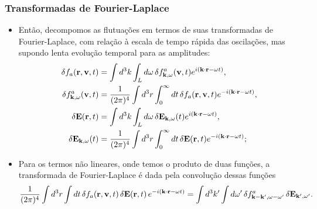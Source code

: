 \documentclass[10pt,aspectratio=1610,lualatex]{beamer}
\begin{document}
\begin{frame}
  \frametitle{Transformadas de Fourier-Laplace}
  \begin{itemize}
    \item Então, decompomos as flutuações em termos de suas
    transformadas de Fourier-Laplace, com relação à escala de
    tempo rápida das oscilações, mas supondo lenta evolução
    temporal para as amplitudes:
    \begin{equation*}
      \begin{split}
	\delta f_a({\bf r}, {\bf v},t)
	&=\int d^3k \int_L d \omega\,\delta f^a_{{\bf k}, \omega}({\bf v}, t)
	e^{i({\bf k \cdot r}-\omega t)},\\
	\delta f^a_{{\bf k}, \omega}({\bf v}, t)
	&=\frac{1}{(2 \pi)^4}\int d^3r \int_0^{\infty} dt\,
	\delta f_a({\bf r},{\bf v},t) e^{-i({\bf k \cdot r} - \omega t)},\\
	\delta {\bf E}({\bf r},t)
	&=\int d^3k \int_L d\omega\, \delta{\bf E}_{{\bf k},\omega}(t)
	e^{i({\bf k \cdot r}-\omega t)},\\
	\delta{\bf E}_{{\bf k},\omega}(t)
	&=\frac{1}{(2 \pi)^4}\int d^3r\int_0^{\infty} dt\,
	\delta{\bf  E}({\bf   r},t) e^{-i({\bf k \cdot r} - \omega t)};
      \end{split}
    \end{equation*}
    \vspace{-0.2cm}
    \pause
    \item Para os termos não lineares, onde temos o produto de duas
    funções, a transformada de Fourier-Laplace é dada pela convolução
    dessas funções
    \begin{equation*}
      \frac{1}{(2\pi)^4}\int d^3r \int dt\,
      \delta f_a({\bf r}, {\bf v},t)\,
      \delta{\bf E}({\bf r},t)\, e^{-i({\bf k \cdot r}-\omega t)}
      =\int d^3k' \int d\omega '\,\delta f^a_{{\bf k-k'},\omega-\omega '}\,
      \delta{\bf E}_{{\bf k'},\omega '}.
    \end{equation*}
  \end{itemize}
\end{frame}
\end{document}
